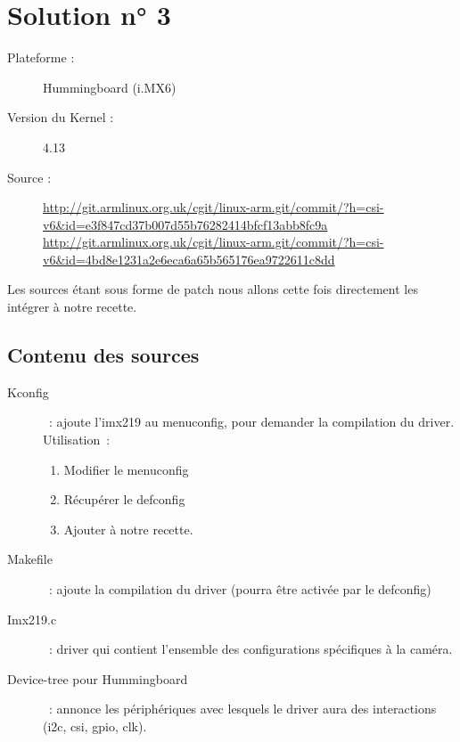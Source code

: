 
\chapter{Solution n° 3} %

\label{Chapter4} %

\begin{description}
  \item[Plateforme :] Hummingboard (i.MX6)
  \item[Version du Kernel :] 4.13
  \item[Source :] \href{http://git.armlinux.org.uk/cgit/linux-arm.git/commit/?h=csi-v6&id=e3f847cd37b007d55b76282414bfcf13abb8fc9a}
  {http://git.armlinux.org.uk/cgit/linux-arm.git/commit/?h=csi-v6\&id=e3f847cd37b007d55b76282414bfcf13abb8fc9a}
  \href{http://git.armlinux.org.uk/cgit/linux-arm.git/commit/?h=csi-v6&id=4bd8e1231a2e6eca6a65b565176ea9722611c8dd}
  {http://git.armlinux.org.uk/cgit/linux-arm.git/commit/?h=csi-v6\&id=4bd8e1231a2e6eca6a65b565176ea9722611c8dd}
\end{description}

Les sources étant sous forme de patch nous allons cette fois directement les intégrer à notre recette.

\section{Contenu des sources}
\begin{description}
\item[Kconfig] : ajoute l’imx219 au menuconfig, pour demander la compilation du driver. Utilisation :
\begin{enumerate}
  \item Modifier le menuconfig
  \item Récupérer le defconfig
  \item Ajouter à notre recette.
\end{enumerate}
\item[Makefile] : ajoute la compilation du driver (pourra être activée par le defconfig)
\item[Imx219.c] : driver qui contient l’ensemble des configurations spécifiques à la caméra.
\item[Device-tree pour Hummingboard] : annonce les périphériques avec lesquels le driver aura des interactions (i2c, csi, gpio, clk).
\end{description}


